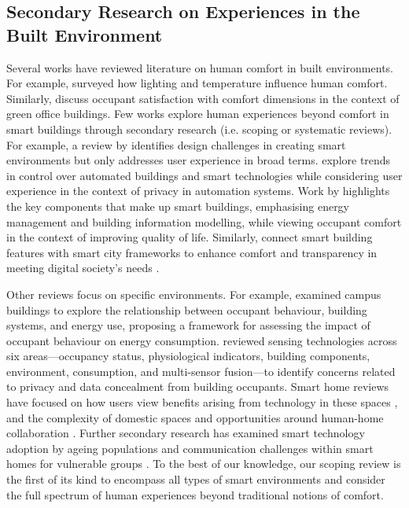 \subsection{Secondary Research on Experiences in the Built Environment}
Several works have reviewed literature on human comfort in built environments. For example, \citet{frontczak2011literature} surveyed how lighting and temperature influence human comfort. Similarly, \citet{zhang2012factors} discuss occupant satisfaction with comfort dimensions in the context of green office buildings. Few works explore human experiences beyond comfort in smart buildings through secondary research (i.e. scoping or systematic reviews). For example, a review by \citet{pourzolfaghar2016investigating} identifies design challenges in creating smart environments but only addresses user experience in broad terms. \citet{aliero2022systematic} explore trends in control over automated buildings and smart technologies while considering user experience in the context of privacy in automation systems. Work by \citet{saputra2023smart} highlights the key components that make up smart buildings, emphasising energy management and building information modelling, while viewing occupant comfort in the context of improving quality of life. Similarly, \citet{latifah2020smart} connect smart building features with smart city frameworks to enhance comfort and transparency in meeting digital society's needs \cite{latifah2020smart}.

Other reviews focus on specific environments. For example, \citet{backlund2023building} examined campus buildings to explore the relationship between occupant behaviour, building systems, and energy use, proposing a framework for assessing the impact of occupant behaviour on energy consumption. \citet{ji2023systematic} reviewed sensing technologies across six areas---occupancy status, physiological indicators, building components, environment, consumption, and multi-sensor fusion---to identify concerns related to privacy and data concealment from building occupants. Smart home reviews have focused on how users view benefits arising from technology in these spaces  \cite{marikyan2019systematic}, and the complexity of domestic spaces and opportunities around human-home collaboration \cite{mennicken2014today}. Further secondary research has examined smart technology adoption by ageing populations \cite{ma2022smart} and communication challenges within smart homes for vulnerable groups \cite{jamwal2022smart}. 
To the best of our knowledge, our scoping review is the first of its kind to encompass all types of smart environments and consider the full spectrum of human experiences beyond traditional notions of comfort.